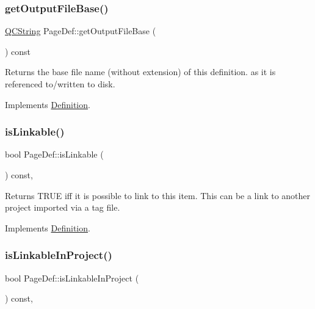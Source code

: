 \subsubsection{\texorpdfstring{getOutputFileBase()}{getOutputFileBase()}}
{\footnotesize\ttfamily \mbox{\hyperlink{class_q_c_string}{Q\+C\+String}} Page\+Def\+::get\+Output\+File\+Base (\begin{DoxyParamCaption}{ }\end{DoxyParamCaption}) const\hspace{0.3cm}{\ttfamily [virtual]}}

Returns the base file name (without extension) of this definition. as it is referenced to/written to disk. 

Implements \mbox{\hyperlink{class_definition_acabecdc6bfda2015811eed5f3436322d}{Definition}}.

\mbox{\label{class_page_def_acb0b424141cbb7c1b6b5a52769cf7b06}} 
\subsubsection{\texorpdfstring{isLinkable()}{isLinkable()}}
{\footnotesize\ttfamily bool Page\+Def\+::is\+Linkable (\begin{DoxyParamCaption}{ }\end{DoxyParamCaption}) const\hspace{0.3cm}{\ttfamily [inline]}, {\ttfamily [virtual]}}

Returns T\+R\+UE iff it is possible to link to this item. This can be a link to another project imported via a tag file. 

Implements \mbox{\hyperlink{class_definition_a4002fd79c2d4dcf667c37c83d4214deb}{Definition}}.

\mbox{\label{class_page_def_a8aeb711470609d0be377c2b56aee9cef}} 
\subsubsection{\texorpdfstring{isLinkableInProject()}{isLinkableInProject()}}
{\footnotesize\ttfamily bool Page\+Def\+::is\+Linkable\+In\+Project (\begin{DoxyParamCaption}{ }\end{DoxyParamCaption}) const\hspace{0.3cm}{\ttfamily [inline]}, {\ttfamily [virtual]}}

